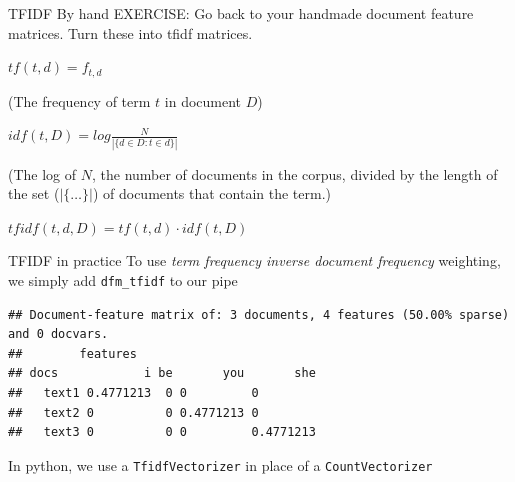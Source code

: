 \documentclass[
  10pt,
  ignorenonframetext,
  aspectratio=169]{beamer}
\newenvironment{Shaded}{\begin{snugshade}}{\end{snugshade}}
\newcommand{\AttributeTok}[1]{\textcolor[rgb]{0.80,0.80,0.80}{#1}}
\newcommand{\FunctionTok}[1]{\textcolor[rgb]{0.94,0.94,0.56}{#1}}
\newcommand{\NormalTok}[1]{\textcolor[rgb]{0.80,0.80,0.80}{#1}}
\newcommand{\OtherTok}[1]{\textcolor[rgb]{0.94,0.94,0.56}{#1}}
\newcommand{\SpecialCharTok}[1]{\textcolor[rgb]{0.86,0.64,0.64}{#1}}
\newcommand{\StringTok}[1]{\textcolor[rgb]{0.80,0.58,0.58}{#1}}
\begin{document}
\begin{frame}{TFIDF By hand}
\protect\hypertarget{tfidf-by-hand}{}
EXERCISE: Go back to your handmade document feature matrices. Turn these
into tfidf matrices.

\(tf(t,d) = f_{t,d}\)

(The frequency of term \(t\) in document \(D\))

\(idf(t,D) = log \frac{N}{|\{ d \in D : t\in d\}|}\)

(The log of \(N\), the number of documents in the corpus, divided by the
length of the set (\(|\{\dots\}|\)) of documents that contain the term.)

\(tfidf(t,d,D) = tf(t,d) \cdot idf(t,D)\)
\end{frame}

\begin{frame}[fragile]{TFIDF in practice}
\protect\hypertarget{tfidf-in-practice}{}
To use \emph{term frequency inverse document frequency} weighting, we
simply add \texttt{dfm\_tfidf} to our pipe

\scriptsize

\begin{Shaded}
\end{Shaded}

\begin{verbatim}
## Document-feature matrix of: 3 documents, 4 features (50.00% sparse) and 0 docvars.
##        features
## docs            i be       you       she
##   text1 0.4771213  0 0         0        
##   text2 0          0 0.4771213 0        
##   text3 0          0 0         0.4771213
\end{verbatim}

\normalsize

In python, we use a \texttt{TfidfVectorizer} in place of a
\texttt{CountVectorizer}
\end{frame}
\end{document}
